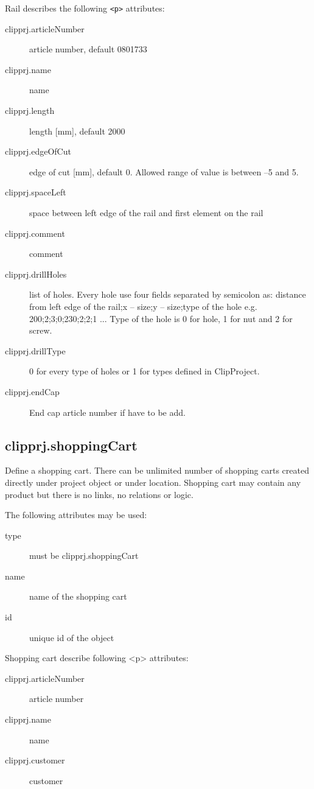 \documentclass[%
	a4paper,
	oneside,
	listof=numbered,
	parskip=half,
	headsepline=true,
	footsepline=false,
	normalheadings,
	0.7headlines,
	headexclude,
	]{scrbook}
\begin{document}
Rail describes the following \verb|<p>| attributes: 

\begin{description}
	\item[clipprj.articleNumber] article number, default 0801733 
	\item[clipprj.name] name 
	\item[clipprj.length] length [mm], default 2000 
	\item[clipprj.edgeOfCut] edge of cut [mm], default 0. Allowed range of value is between –5 and 5. 
	\item[clipprj.spaceLeft] space between left edge of the rail and first element on the rail 
	\item[clipprj.comment] comment 
	\item[clipprj.drillHoles] list of holes. Every hole use four fields separated by semicolon as: distance from left edge of the rail;x – size;y – size;type of the hole e.g. 200;2;3;0;230;2;2;1 ... Type of the hole is 0 for hole, 1 for nut and 2 for screw. 
	\item[clipprj.drillType] 0 for every type of holes or 1 for types defined in ClipProject. 
	\item[clipprj.endCap] End cap article number if have to be add. 
\end{description}

\subsection{clipprj.shoppingCart} 

Define a shopping cart. There can be unlimited number of shopping carts created directly under project object or under location. Shopping cart may contain any product but there is no links, no relations or logic.

The following attributes may be used:

\begin{description}
	\item[type] must be clipprj.shoppingCart
	\item[name] name of the shopping cart
	\item[id] unique id of the object
\end{description}

Shopping cart describe following <p> attributes: 

\begin{description}
	\item[clipprj.articleNumber] article number 
	\item[clipprj.name] name 
	\item[clipprj.customer] customer 
\end{description}
 
\end{document}
